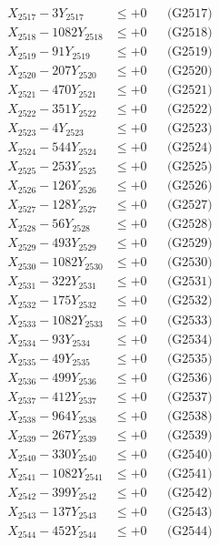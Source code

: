 \documentclass[a4paper,10pt]{article}
\begin{document}
{\begin{align}
X_{2517} - 3Y_{2517} &\leq +0 && \text{(G2517)} \\
X_{2518} - 1082Y_{2518} &\leq +0 && \text{(G2518)} \\
X_{2519} - 91Y_{2519} &\leq +0 && \text{(G2519)} \\
X_{2520} - 207Y_{2520} &\leq +0 && \text{(G2520)} \\
\allowbreak
X_{2521} - 470Y_{2521} &\leq +0 && \text{(G2521)} \\
X_{2522} - 351Y_{2522} &\leq +0 && \text{(G2522)} \\
X_{2523} - 4Y_{2523} &\leq +0 && \text{(G2523)} \\
X_{2524} - 544Y_{2524} &\leq +0 && \text{(G2524)} \\
X_{2525} - 253Y_{2525} &\leq +0 && \text{(G2525)} \\
X_{2526} - 126Y_{2526} &\leq +0 && \text{(G2526)} \\
X_{2527} - 128Y_{2527} &\leq +0 && \text{(G2527)} \\
X_{2528} - 56Y_{2528} &\leq +0 && \text{(G2528)} \\
X_{2529} - 493Y_{2529} &\leq +0 && \text{(G2529)} \\
X_{2530} - 1082Y_{2530} &\leq +0 && \text{(G2530)} \\
\allowbreak
X_{2531} - 322Y_{2531} &\leq +0 && \text{(G2531)} \\
X_{2532} - 175Y_{2532} &\leq +0 && \text{(G2532)} \\
X_{2533} - 1082Y_{2533} &\leq +0 && \text{(G2533)} \\
X_{2534} - 93Y_{2534} &\leq +0 && \text{(G2534)} \\
X_{2535} - 49Y_{2535} &\leq +0 && \text{(G2535)} \\
X_{2536} - 499Y_{2536} &\leq +0 && \text{(G2536)} \\
X_{2537} - 412Y_{2537} &\leq +0 && \text{(G2537)} \\
X_{2538} - 964Y_{2538} &\leq +0 && \text{(G2538)} \\
X_{2539} - 267Y_{2539} &\leq +0 && \text{(G2539)} \\
X_{2540} - 330Y_{2540} &\leq +0 && \text{(G2540)} \\
\allowbreak
X_{2541} - 1082Y_{2541} &\leq +0 && \text{(G2541)} \\
X_{2542} - 399Y_{2542} &\leq +0 && \text{(G2542)} \\
X_{2543} - 137Y_{2543} &\leq +0 && \text{(G2543)} \\
X_{2544} - 452Y_{2544} &\leq +0 && \text{(G2544)} \\

\end{align}}
\end{document}
